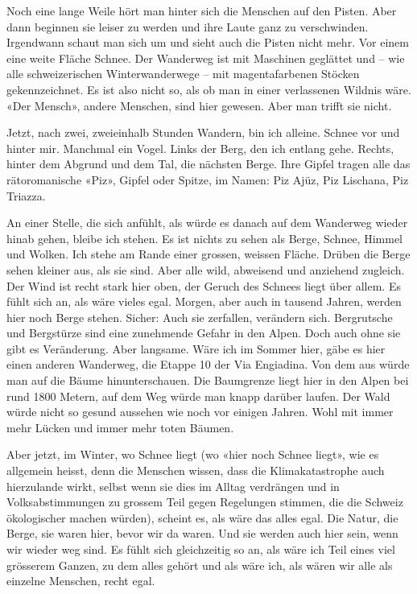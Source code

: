 \documentclass[a4paper,
fontsize=11pt,
oneside,
numbers=noperiodatend,
parskip=half-,
bibliography=totoc,
final
]{scrartcl}
\begin{document}
Noch eine lange Weile hört man hinter sich die Menschen auf den Pisten.
Aber dann beginnen sie leiser zu werden und ihre Laute ganz zu
verschwinden. Irgendwann schaut man sich um und sieht auch die Pisten
nicht mehr. Vor einem eine weite Fläche Schnee. Der Wanderweg ist mit
Maschinen geglättet und -- wie alle schweizerischen Winterwanderwege --
mit magentafarbenen Stöcken gekennzeichnet. Es ist also nicht so, als ob
man in einer verlassenen Wildnis wäre. «Der Mensch», andere Menschen,
sind hier gewesen. Aber man trifft sie nicht.

Jetzt, nach zwei, zweieinhalb Stunden Wandern, bin ich alleine. Schnee
vor und hinter mir. Manchmal ein Vogel. Links der Berg, den ich entlang
gehe. Rechts, hinter dem Abgrund und dem Tal, die nächsten Berge. Ihre
Gipfel tragen alle das rätoromanische «Piz», Gipfel oder Spitze, im
Namen: Piz Ajüz, Piz Lischana, Piz Triazza.

An einer Stelle, die sich anfühlt, als würde es danach auf dem Wanderweg
wieder hinab gehen, bleibe ich stehen. Es ist nichts zu sehen als Berge,
Schnee, Himmel und Wolken. Ich stehe am Rande einer grossen, weissen
Fläche. Drüben die Berge sehen kleiner aus, als sie sind. Aber alle
wild, abweisend und anziehend zugleich. Der Wind ist recht stark hier
oben, der Geruch des Schnees liegt über allem. Es fühlt sich an, als
wäre vieles egal. Morgen, aber auch in tausend Jahren, werden hier noch
Berge stehen. Sicher: Auch sie zerfallen, verändern sich. Bergrutsche
und Bergstürze sind eine zunehmende Gefahr in den Alpen. Doch auch ohne
sie gibt es Veränderung. Aber langsame. Wäre ich im Sommer hier, gäbe es
hier einen anderen Wanderweg, die Etappe 10 der Via Engiadina. Von dem
aus würde man auf die Bäume hinunterschauen. Die Baumgrenze liegt hier
in den Alpen bei rund 1800 Metern, auf dem Weg würde man knapp darüber
laufen. Der Wald würde nicht so gesund aussehen wie noch vor einigen
Jahren. Wohl mit immer mehr Lücken und immer mehr toten Bäumen.

Aber jetzt, im Winter, wo Schnee liegt (wo «hier noch Schnee liegt», wie
es allgemein heisst, denn die Menschen wissen, dass die Klimakatastrophe
auch hierzulande wirkt, selbst wenn sie dies im Alltag verdrängen und in
Volksabstimmungen zu grossem Teil gegen Regelungen stimmen, die die
Schweiz ökologischer machen würden), scheint es, als wäre das alles
egal. Die Natur, die Berge, sie waren hier, bevor wir da waren. Und sie
werden auch hier sein, wenn wir wieder weg sind. Es fühlt sich
gleichzeitig so an, als wäre ich Teil eines viel grösserem Ganzen, zu
dem alles gehört und als wäre ich, als wären wir alle als einzelne
Menschen, recht egal.
\end{document}
